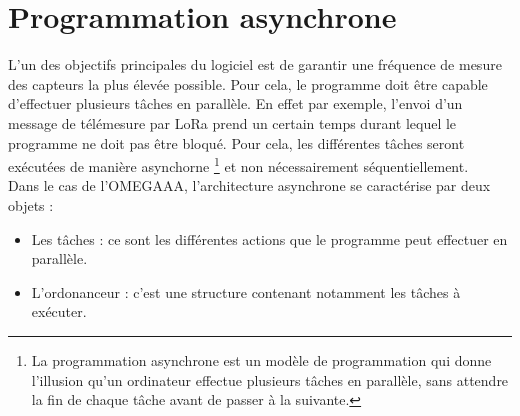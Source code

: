 \section{Programmation asynchrone}
\label{sec:async}

L'un des objectifs principales du logiciel est de garantir une fréquence de mesure
des capteurs la plus élevée possible. Pour cela, le programme doit être capable
d'effectuer plusieurs tâches en parallèle. En effet par exemple, l'envoi d'un message
de télémesure par LoRa prend un certain temps durant lequel le programme ne doit pas
être bloqué. Pour cela, les différentes tâches seront exécutées de manière asynchorne
\footnote{La programmation asynchrone est un modèle de programmation qui donne l'illusion
qu'un ordinateur effectue plusieurs tâches en parallèle, sans attendre la fin de chaque
tâche avant de passer à la suivante.} et non nécessairement séquentiellement.\\

Dans le cas de l'OMEGAAA, l'architecture asynchrone se caractérise par deux objets :
\begin{itemize}
    \item Les tâches : ce sont les différentes actions que le programme peut effectuer
    en parallèle.
    \item L'ordonanceur : c'est une structure contenant notamment les tâches à exécuter.
\end{itemize}






